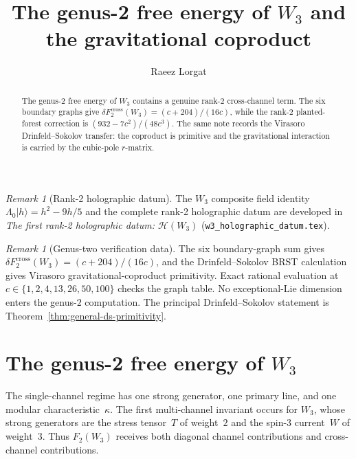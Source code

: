 \documentclass[11pt]{article}
\title{The genus-2 free energy of $W_3$ and the gravitational coproduct}
\author{Raeez Lorgat}
\date{}
\theoremstyle{plain}
\theoremstyle{definition}
\theoremstyle{remark}
\newtheorem{remark}[theorem]{Remark}
\begin{document}
\maketitle
\begin{abstract}
The genus-$2$ free energy of $W_3$ contains a genuine rank-$2$
cross-channel term. The six boundary graphs give
$\delta F_2^{\mathrm{cross}}(W_3)=(c+204)/(16c)$, while the
rank-$2$ planted-forest correction is
$(932-7c^2)/(48c^3)$. The same note records the Virasoro
Drinfeld--Sokolov transfer: the coproduct is primitive and the
gravitational interaction is carried by the cubic-pole
$r$-matrix.
\end{abstract}
\fi


\begin{remark}[Rank-2 holographic datum]
The $W_3$ composite field identity
$\Lambda_0|h\rangle = h^2 - 9h/5$ and the complete rank-2 holographic
datum are developed in \emph{The first rank-2
holographic datum: $\mathcal{H}(W_3)$}
(\texttt{w3\_holographic\_datum.tex}).
\end{remark}

\begin{remark}[Genus-two verification data]\label{rem:computation-anchors}
The six boundary-graph sum gives
$\delta F_2^{\mathrm{cross}}(W_3)=(c+204)/(16c)$, and the
Drinfeld--Sokolov BRST calculation gives Virasoro
gravitational-coproduct primitivity. Exact rational evaluation at
$c\in\{1,2,4,13,26,50,100\}$ checks the graph table. No
exceptional-Lie dimension enters the genus-$2$ computation. The
principal Drinfeld--Sokolov statement is
Theorem~\ref{thm:general-ds-primitivity}.
\end{remark}

\section{The genus-2 free energy of \texorpdfstring{$W_3$}{W3}}
\label{sec:genus2-w3}

The single-channel regime has one strong generator, one primary line,
and one modular characteristic~$\kappa$. The first multi-channel
invariant occurs for $W_3$, whose strong generators are the stress
tensor~$T$ of weight~$2$ and the spin-$3$ current~$W$ of weight~$3$.
Thus $F_2(W_3)$ receives both diagonal channel contributions and
cross-channel contributions.
\end{document}
